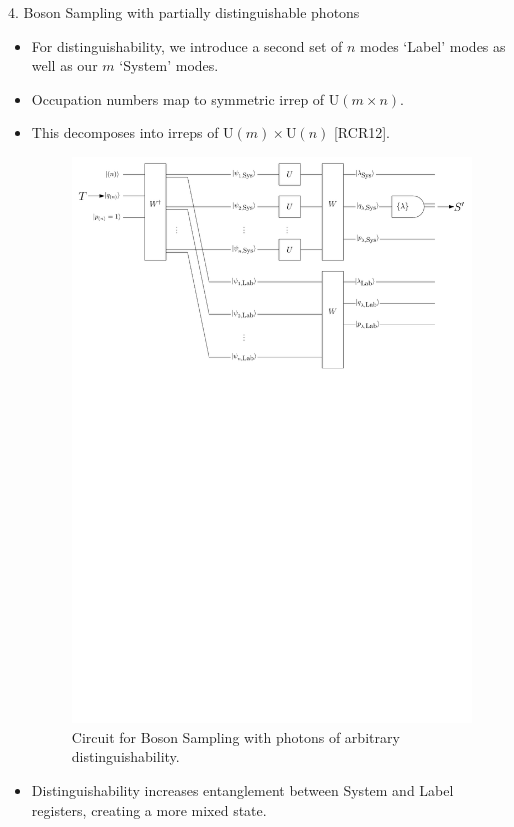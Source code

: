 \documentclass[]{templates/poster}
\begin{document}
\begin{frame}{}
\begin{columns}[t]
  \begin{column}{0.422\linewidth}
  
  \begin{block}{4. Boson Sampling with partially distinguishable photons}
  \begin{itemize}
  \item For distinguishability, we introduce a second set of $n$ modes `Label' modes as well as our $m$ `System' modes.
  \item Occupation numbers map to symmetric irrep of $\textrm{U}(m \times n)$.
  \item This decomposes into irreps of $\textrm{U}(m)\times \textrm{U}(n)$ [RCR12].
  \begin{center}
  \begin{figure}
  \includegraphics[width=0.75\linewidth]{noisy_circuit_rep2}
  \caption{\label{fig:noisy-circuit} Circuit for Boson Sampling with photons of arbitrary distinguishability.}
  \end{figure}
  \end{center}
  \item Distinguishability increases entanglement between System and Label registers, creating a more mixed state.
  \end{itemize}
  \end{block}
  

\end{column}
\end{columns}
\end{frame}
\end{document}
